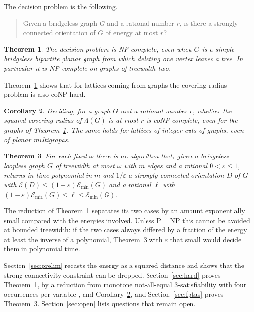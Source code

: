 \documentclass[11pt]{amsart}
\newtheorem{thm}{Theorem}[section]
\newtheorem{cor}[thm]{Corollary}
\theoremstyle{definition}
\theoremstyle{remark}
\numberwithin{equation}{section}
\newcommand{\Emin}{\mathcal E_{\min}}
\begin{document}
The decision problem is the following.
\begin{quote}
Given a bridgeless graph $G$ and a rational number $r$, is there a strongly connected orientation of $G$ of energy at most $r$?
\end{quote}

\begin{thm}\label{thm:hard}
The decision problem is NP-complete, even when $G$ is a simple bridgeless bipartite planar graph from which deleting one vertex leaves a tree. In particular it is NP-complete on graphs of treewidth two.
\end{thm}

Theorem~\ref{thm:hard} shows that for lattices coming from graphs the covering radius problem is also coNP-hard.

\begin{cor}\label{cor:cov}
Deciding, for a graph $G$ and a rational number $r$, whether the squared covering radius of $\Lambda(G)$ is at most $r$ is coNP-complete, even for the graphs of Theorem~\ref{thm:hard}. The same holds for lattices of integer cuts of graphs, even of planar multigraphs.
\end{cor}

\begin{thm}\label{thm:fptas}
For each fixed $\omega$ there is an algorithm that, given a bridgeless loopless graph $G$ of treewidth at most $\omega$ with $m$ edges and a rational $0<\varepsilon\le1$, returns in time polynomial in $m$ and $1/\varepsilon$ a strongly connected orientation $D$ of $G$ with $\mathcal E(D)\le(1+\varepsilon)\Emin(G)$ and a rational $\ell$ with $(1-\varepsilon)\Emin(G)\le\ell\le\Emin(G)$.
\end{thm}

The reduction of Theorem~\ref{thm:hard} separates its two cases by an amount exponentially small compared with the energies involved. Unless $\mathrm{P}=\mathrm{NP}$ this cannot be avoided at bounded treewidth: if the two cases always differed by a fraction of the energy at least the inverse of a polynomial, Theorem~\ref{thm:fptas} with $\varepsilon$ that small would decide them in polynomial time.

Section~\ref{sec:prelim} recasts the energy as a squared distance and shows that the strong connectivity constraint can be dropped. Section~\ref{sec:hard} proves Theorem~\ref{thm:hard}, by a reduction from monotone not-all-equal 3-satisfiability with four occurrences per variable \cite{DD20}, and Corollary~\ref{cor:cov}, and Section~\ref{sec:fptas} proves Theorem~\ref{thm:fptas}. Section~\ref{sec:open} lists questions that remain open.
\end{document}
